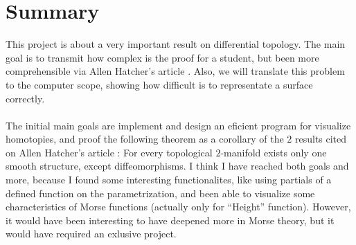 %

\chapter{Summary}
This project is about a very important result on differential topology. The main goal is to transmit how complex is the proof for a student, but been more comprehensible via Allen Hatcher's article \cite{arXiv:1312.3518}. Also, we will translate this problem to the computer scope, showing how difficult is to representate a surface correctly.\\
\\The initial main goals are implement and design an eficient program for visualize homotopies, and proof the following theorem as a corollary of the $2$ results cited on Allen Hatcher's article \cite{arXiv:1312.3518}: For every topological $2$-manifold exists only one smooth structure, except diffeomorphisms. I think I have reached both goals and more, because I found some interesting functionalites, like using partials of a defined function on the parametrization, and been able to visualize some characteristics of Morse functions (actually only for ``Height'' function). However, it would have been interesting to have deepened more in Morse theory, but it would have required an exlusive project.\\

